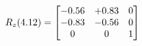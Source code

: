 \documentclass[preview]{standalone}
\begin{document}
\begin{align*}
\special{dvisvgm:raw <g id='unique000'>}R_{z}(4.12) = \begin{bmatrix}-0.56 & +0.83 & 0 \\-0.83 & -0.56 & 0 \\0 & 0 & 1\end{bmatrix}\special{dvisvgm:raw </g>}
\end{align*}
\end{document}
